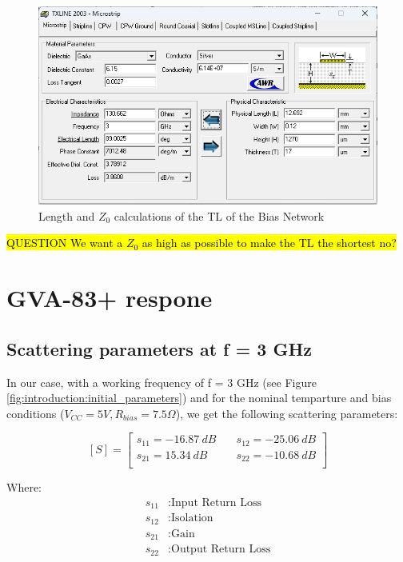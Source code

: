\documentclass[12pt]{report} %
\newcommand{\question}[1]{\sethlcolor{red}\hl{QUESTION #1}}
\begin{document}
\begin{figure}[htbp]
    \centering
    \includegraphics[width=\textwidth]{images/design_circuit_elements/txline_tool_bias_network_amplifier_transmission_line.png}
    \caption{Length and $Z_0$ calculations of the TL of the Bias Network}
    \label{fig:design_circuit_elements:txline_tool_bias_network_amplifier_transmission_line}
\end{figure}

\question{We want a $Z_0$ as high as possible to make the TL the shortest no?}

\section{GVA-83+ respone}
 
\subsection{Scattering parameters at f = 3 GHz}

In our case, with a working frequency of f = 3 GHz (see Figure \ref{fig:introduction:initial_parameters}) and for the nominal temparture and bias conditions ($V_{CC} = 5V, R_{bias} = 7.5 \Omega$), we get the following scattering parameters:

\[
[S] = \begin{bmatrix}
s_{11} = -16.87 \ dB & \quad s_{12} = -25.06 \ dB \\
s_{21} = 15.34 \ dB & \quad s_{22} = -10.68 \ dB \\
\end{bmatrix}
\]

Where:
\begin{align*}
s_{11} & : \text{Input Return Loss} \\
s_{12} & : \text{Isolation} \\
s_{21} & : \text{Gain} \\
s_{22} & : \text{Output Return Loss}
\end{align*}
\end{document}
